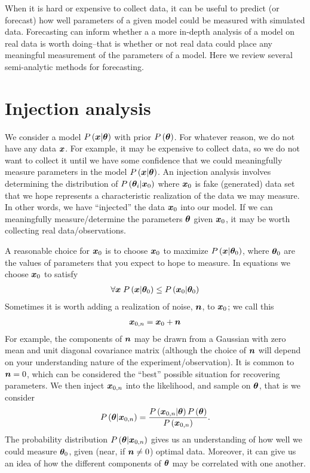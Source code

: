 When it is hard or expensive to collect data, it can be useful to 
predict (or forecast) how well parameters of a given model could be measured
with simulated data.
Forecasting can inform whether a a more in-depth analysis of a model on real
data is worth doing--that is whether or not real data could place any meaningful
measurement of the parameters of a model.
Here we review several semi-analytic methods for forecasting. 

\section{Injection analysis}

We consider a model $P\left({\bm x}|{\bm \theta}\right)$ with prior $P\left({\bm \theta}\right)$.
For whatever reason, we do not have any data ${\bm x}$.
For example, it may be expensive to collect data, so we do not want to collect
it until we have some confidence that we could meaningfully measure parameters
in the model $P\left({\bm x}|{\bm \theta}\right)$.
An injection analysis involves determining the distribution of  
$P\left({\bm \theta}_i|{\bm x}_0\right)$ where
${\bm x}_0$ is fake (generated) data set that we hope represents a characteristic realization
of the data we may measure.
In other words, we have ``injected'' the data ${\bm x}_0$ into our model.
If we can meaningfully measure/determine the parameters ${\bm \theta}$ given ${\bm x}_0$,
it may be worth collecting real data/observations.

A reasonable choice for ${\bm x}_0$ is to choose ${\bm x}_0$ to maximize $P\left({\bm x}|{\bm \theta}_0\right)$,
where ${\bm \theta}_0$ are the values of parameters that you expect to hope to measure. 
In equations we choose ${\bm x}_0$ to satisfy
\begin{align}
    \forall {\bm x} \; P\left({\bm x}|{\bm \theta}_0\right) \leq P\left({\bm x}_0|{\bm \theta}_0\right)
\end{align}
Sometimes it is worth adding a realization of noise, ${\bm n}$, to ${\bm x}_0$; we call this
\begin{align}
    {\bm x}_{0,n} = {\bm x}_0 + {\bm n}
\end{align}
For example, the components of ${\bm n}$ may be drawn from a Gaussian with zero
mean and unit diagonal covariance matrix (although the choice of ${\bm n}$ will depend
on your understanding nature of the experiment/observation).
It is common to ${\bm n}=0$, which can be considered the ``best'' possible situation for
recovering parameters.
We then inject ${\bm x}_{0,n}$ into the likelihood, and sample on ${\bm \theta}$,
that is we consider
\begin{align}
    \label{eq:injection-bayes-theorem}
    P\left({\bm \theta}|{\bm x}_{0,n}\right)
    =
    \frac{P\left({\bm x}_{0,n}|{\bm \theta}\right)P\left({\bm \theta}\right)}{P\left({\bm x}_{0,n}\right)}
    .
\end{align}
The probability distribution $P\left({\bm \theta}|{\bm x}_{0,n}\right)$ gives us an understanding
of how well we could measure ${\bm \theta}_0$, given (near, if ${\bm n}\neq0$) optimal data.
Moreover, it can give us an idea of how the different components of ${\bm \theta}$ may
be correlated with one another.

